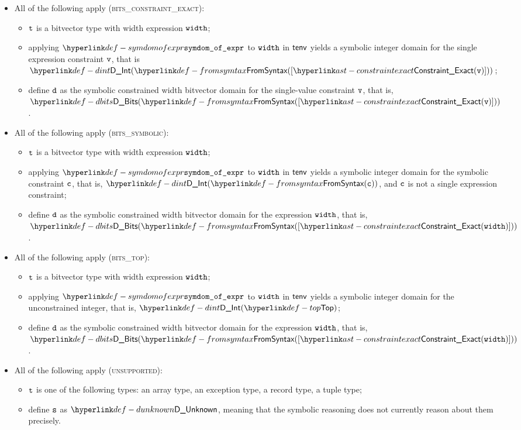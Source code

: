 \begin{itemize}
  \item All of the following apply (\textsc{bits\_constraint\_exact}):
  \begin{itemize}
    \item $\texttt{t}$ is a bitvector type with width expression $\texttt{width}$;
    \item applying $\symdomofexpr$ to $\texttt{width}$ in $\textsf{tenv}$ yields a symbolic integer domain for the single expression constraint $\texttt{v}$,
          that is \\
          $\DInt(\FromSyntax([\ConstraintExact(\vv)]))$;
    \item define $\texttt{d}$ as the symbolic constrained width bitvector domain for the single-value constraint $\texttt{v}$, that is,
          $\DBits(\FromSyntax([\ConstraintExact(\vv)]))$.
  \end{itemize}

  \item All of the following apply (\textsc{bits\_symbolic}):
  \begin{itemize}
    \item $\texttt{t}$ is a bitvector type with width expression $\texttt{width}$;
    \item applying $\symdomofexpr$ to $\texttt{width}$ in $\textsf{tenv}$ yields a symbolic integer domain for the symbolic constraint $\texttt{c}$,
          that is, $\DInt(\FromSyntax(\vc))$, and $\texttt{c}$ is not a single expression constraint;
    \item define $\texttt{d}$ as the symbolic constrained width bitvector domain for the expression $\texttt{width}$, that is,
          $\DBits(\FromSyntax([\ConstraintExact(\width)]))$.
  \end{itemize}

  \item All of the following apply (\textsc{bits\_top}):
  \begin{itemize}
    \item $\texttt{t}$ is a bitvector type with width expression $\texttt{width}$;
    \item applying $\symdomofexpr$ to $\texttt{width}$ in $\textsf{tenv}$ yields a symbolic integer domain for the unconstrained integer,
          that is, $\DInt(\Top)$;
    \item define $\texttt{d}$ as the symbolic constrained width bitvector domain for the expression $\texttt{width}$, that is,
          $\DBits(\FromSyntax([\ConstraintExact(\width)]))$.
  \end{itemize}

  \item All of the following apply (\textsc{unsupported}):
  \begin{itemize}
    \item $\texttt{t}$ is one of the following types: an array type, an exception type, a record type, a tuple type;
    \item define $\texttt{s}$ as $\DUnknown$, meaning that the symbolic reasoning does not currently reason about them precisely.
  \end{itemize}


\end{itemize}

